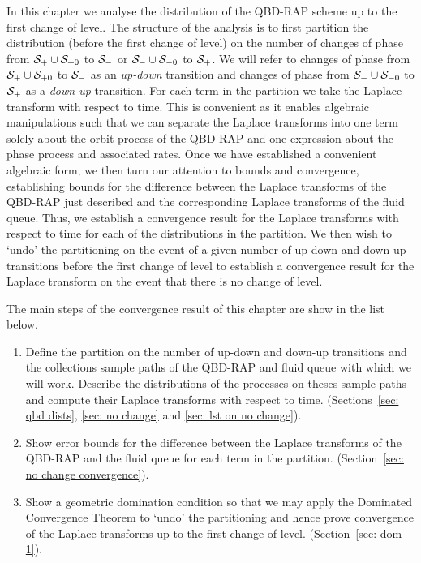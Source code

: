 In this chapter we analyse the distribution of the QBD-RAP scheme up to the first change of level. The structure of the analysis is to first partition the distribution (before the first change of level) on the number of changes of phase from \(\mathcal{S}_+\cup\mathcal{S}_{+0}\) to \(\mathcal{S}_-\) or \(\mathcal{S}_-\cup\mathcal{S}_{-0}\) to \(\mathcal{S}_+\). We will refer to changes of phase from \(\mathcal{S}_+\cup\mathcal{S}_{+0}\) to \(\mathcal{S}_-\) as an \emph{up-down} transition and changes of phase from \(\mathcal{S}_-\cup\mathcal{S}_{-0}\) to \(\mathcal{S}_+\) as a \emph{down-up} transition. For each term in the partition we take the Laplace transform with respect to time. This is convenient as it enables algebraic manipulations such that we can separate the Laplace transforms into one term solely about the orbit process of the QBD-RAP and one expression about the phase process and associated rates. Once we have established a convenient algebraic form, we then turn our attention to bounds and convergence, establishing bounds for the difference between the Laplace transforms of the QBD-RAP just described and the corresponding Laplace transforms of the fluid queue. Thus, we establish a convergence result for the Laplace transforms with respect to time for each of the distributions in the partition. We then wish to `undo' the partitioning on the event of a given number of up-down and down-up transitions before the first change of level to establish a convergence result for the Laplace transform on the event that there is no change of level. 

The main steps of the convergence result of this chapter are show in the list below.
\begin{enumerate}
	\item\label{step 1} Define the partition on the number of up-down and down-up transitions and the collections sample paths of the QBD-RAP and fluid queue with which we will work. Describe the distributions of the processes on theses sample paths and compute their Laplace transforms with respect to time. (Sections~\ref{sec: qbd dists}, \ref{sec: no change} and \ref{sec: lst on no change}).
	\item\label{step 2} Show error bounds for the difference between the Laplace transforms of the QBD-RAP and the fluid queue for each term in the partition. (Section~\ref{sec: no change convergence}).
	\item\label{step 3} Show a geometric domination condition so that we may apply the Dominated Convergence Theorem to `undo' the partitioning and hence prove convergence of the Laplace transforms up to the first change of level. (Section~\ref{sec: dom 1}).
\end{enumerate}

